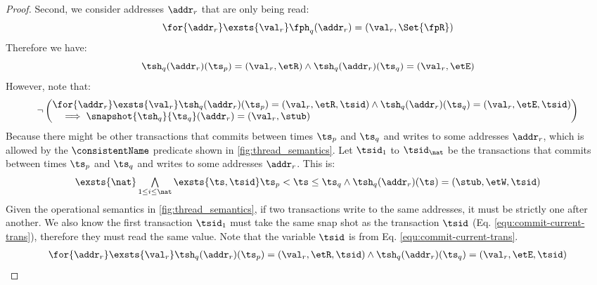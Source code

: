 \begin{proof}
Second, we consider addresses \( \addr_{r} \) that are only being read:
\begin{equation}
    \label{equ:fph-read-value}
    \for{\addr_{r}} \exsts{\val_{r}} 
    \fph_{q}(\addr_{r}) = (\val_{r}, \Set{\fpR})
\end{equation}
Therefore we have:
\begin{equation}
    \label{equ:tsh-read-value}
    \tsh_{q}(\addr_{r})(\ts_{p}) = (\val_{r}, \etR )
    \land \tsh_{q}(\addr_{r})(\ts_{q}) = (\val_{r}, \etE )
\end{equation}
However, note that:
\[
\neg\left(
    \begin{array}{@{}l@{}}
        \for{\addr_{r}} \exsts{\val_{r}} 
        \tsh_{q}(\addr_{r})(\ts_{p}) = (\val_{r}, \etR, \tsid )
        \land \tsh_{q}(\addr_{r})(\ts_{q}) = (\val_{r}, \etE , \tsid) \\
        \quad \implies \snapshot{\tsh_{q}}{\ts_{q}}(\addr_{r}) = (\val_{r}, \stub)
    \end{array}
\right)
\]
Because there might be other transactions that commits between times \( \ts_{p} \) and \( \ts_{q} \) and writes to some addresses \( \addr_{r} \), which is allowed by the \( \consistentName \) predicate shown in \fig \ref{fig:thread_semantics}.
Let \( \tsid_{1} \) to \( \tsid_{\nat} \) be the transactions that commits between times \( \ts_{p} \) and \( \ts_{q} \) and writes to some addresses \( \addr_{r} \).
This is:
\[
    \begin{array}{@{}l@{}}
        \exsts{\nat} 
        \bigwedge\limits_{1 \leq i \leq \nat} \exsts{\ts, \tsid} \ts_{p} < \ts \leq \ts_{q} 
        \land \tsh_{q}(\addr_{r})(\ts) = (\stub, \etW, \tsid) \\
    \end{array}
\]
Given the operational semantics in \fig \ref{fig:thread_semantics}, if two transactions write to the same addresses, it must be strictly one after another.
We also know the first transaction \( \tsid_{1} \) must take the same snap shot as the transaction \( \tsid \) (Eq. \eqref{equ:commit-current-trans}), therefore they must read the same value.
Note that the variable \( \tsid \) is from Eq. \eqref{equ:commit-current-trans}.
\begin{equation}
\label{equ:other-writes}
    \begin{array}{@{}l@{}}
        \for{\addr_{r}} \exsts{\val_{r}} 
        \tsh_{q}(\addr_{r})(\ts_{p}) = (\val_{r}, \etR, \tsid )
        \land \tsh_{q}(\addr_{r})(\ts_{q}) = (\val_{r}, \etE , \tsid) \\

\end{array}
\end{equation}
\end{proof}
